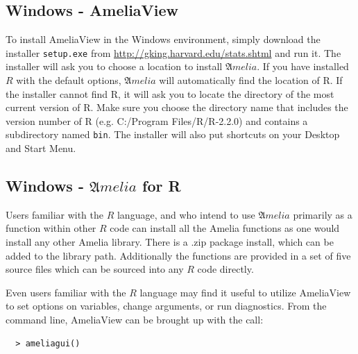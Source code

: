 \documentclass[12pt,titlepage]{article}
\newcommand{\Amelia}{\ensuremath{\mathfrak Amelia} }
\begin{document}
\subsection{Windows - AmeliaView}
\label{sec:win-install}
To install AmeliaView in the Windows environment, simply download the installer \texttt{setup.exe} from \url{http://gking.harvard.edu/stats.shtml} and run it.  The installer will ask you to choose a location to install ${\mathfrak Amelia}$.  If you have installed $R$ with the default options, ${\mathfrak Amelia}$ will automatically find the location of R.  If the installer cannot find R, it will ask you to locate the directory of the most current version of R.  Make sure you choose the directory name that includes the version number of R (e.g. C:/Program Files/R/R-2.2.0) and contains a  subdirectory named \texttt{bin}.  The installer will also put shortcuts on your Desktop and Start Menu.

\subsection{Windows - \Amelia for R}

Users familiar with the $R$ language, and who intend to use \Amelia primarily as a function within other $R$ code can install all the Amelia functions as one would install any other Amelia library.  There is a .zip package install, which can be added to the library path.  Additionally the functions are provided in a set of five source files which can be sourced into any $R$ code directly.

Even users familiar with the $R$ language may find it useful to utilize AmeliaView to set options on variables, change arguments, or run diagnostics.  From the command line, AmeliaView can be brought up with the call:
  \begin{verbatim}
  > ameliagui()
  \end{verbatim}
\end{document}
